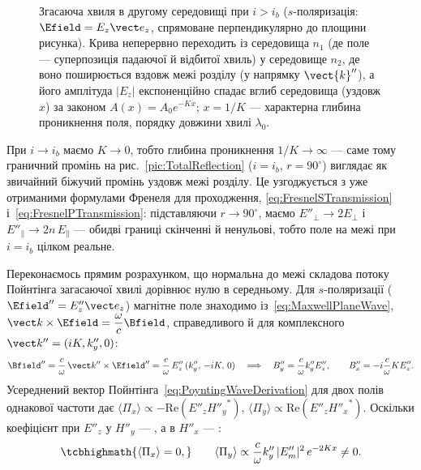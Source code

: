 \begin{figure}[h!]\centering
{}
\caption{Згасаюча хвиля в другому середовищі при $i>i_b$ ($s$-поляризація: $\Efield=E_z\vect e_z$, спрямоване перпендикулярно до площини рисунка). Крива неперервно переходить із середовища $n_1$ (де поле --- суперпозиція падаючої й відбитої хвиль) у середовище $n_2$, де воно поширюється вздовж межі розділу (у напрямку $\vect{k}''$), а його амплітуда $|E_z|$ експоненційно спадає вглиб середовища (уздовж $x$) за законом $A(x)=A_0e^{-Kx}$; $x=1/K$ --- характерна глибина проникнення поля, порядку довжини хвилі $\lambda_0$.\label{tikz:EvanescentWave}}
\end{figure}

При $i\to i_b$ маємо $K\to0$, тобто глибина проникнення $1/K\to\infty$ --- саме тому граничний промінь на рис.~\ref{pic:TotalReflection}
($i=i_b$, $r=90^\circ$) виглядає як звичайний біжучий промінь уздовж межі розділу. Це узгоджується з уже отриманими формулами Френеля
для проходження, \eqref{eq:FresnelSTransmission} і~\eqref{eq:FresnelPTransmission}: підставляючи $r\to90^\circ$, маємо $E''_\perp\to
2E_\perp$ і $E''_\parallel\to2n\,E_\parallel$ --- обидві границі скінченні й ненульові, тобто поле на межі при $i=i_b$ цілком реальне.

Переконаємось прямим розрахунком, що нормальна до межі складова потоку Пойнтінга загасаючої хвилі дорівнює нулю в середньому. Для
$s$-поляризації ($\Efield''=E''_z\vect e_z$) магнітне поле знаходимо із~\eqref{eq:MaxwellPlaneWave}, $\vect k\times\Efield=\dfrac\omega
c\Bfield$, справедливого й для комплексного $\vect k''=(iK,k''_y,0)$:
\begin{equation*}
	\Bfield'' = \frac{c}{\omega}\,\vect k''\times\Efield'' = \frac{c}{\omega}\,E''_z\,(k''_y,\,-iK,\,0)
	\quad\Longrightarrow\quad
	B''_y = \frac{c}{\omega}k''_y E''_z, \qquad B''_x = -i\frac{c}{\omega}K E''_z.
\end{equation*}
Усереднений вектор Пойнтінга~\eqref{eq:PoyntingWaveDerivation} для двох полів однакової частоти дає $\langle\Pi_x\rangle\propto
-\mathrm{Re}(E''_z {H''_y}^{\!*})$, $\langle\Pi_y\rangle\propto\mathrm{Re}(E''_z{H''_x}^{\!*})$. Оскільки коефіцієнт при $E''_z$ у
$H''_y$ --- , а в $H''_x$ --- :
\begin{equation}\label{eq:NormalFluxZero}
	\tcbhighmath{
		\langle\Pi_x\rangle = 0,
	} \qquad
	\langle\Pi_y\rangle \propto \frac{c}{\omega}k''_y\,|E''_m|^2\,e^{-2Kx} \neq 0.
\end{equation}

